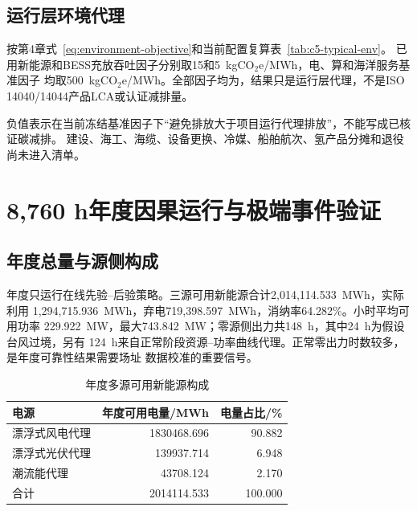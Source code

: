 \subsection{运行层环境代理}

按第4章式~\eqref{eq:environment-objective}和当前配置复算表~\ref{tab:c5-typical-env}。
已用新能源和BESS充放吞吐因子分别取15和5~kgCO$_2$e/MWh，电、算和海洋服务基准因子
均取500~kgCO$_2$e/MWh。全部因子均为\assumptiontag，结果只是运行层代理，不是ISO
14040/14044产品LCA或认证减排量\cite{iso14040,iso14044}。

\begin{table}[htbp]
\centering
\caption{正常典型48 h运行层温室气体代理}
\label{tab:c5-typical-env}
\end{table}

负值表示在当前冻结基准因子下“避免排放大于项目运行代理排放”，不能写成已核证碳减排。
建设、海工、海缆、设备更换、冷媒、船舶航次、氢产品分摊和退役尚未进入清单。

\section{8,760 h年度因果运行与极端事件验证}

\subsection{年度总量与源侧构成}

年度只运行在线先验--后验策略。三源可用新能源合计2,014,114.533~MWh，实际利用
1,294,715.936~MWh，弃电719,398.597~MWh，消纳率64.282\%。小时平均可用功率
229.922~MW，最大743.842~MW；零源侧出力共148~h，其中24~h为假设台风过境，另有
124~h来自正常阶段资源--功率曲线代理。正常零出力时数较多，是年度可靠性结果需要场址
数据校准的重要信号。

\begin{table}[htbp]
\centering
\caption{年度多源可用新能源构成}
\label{tab:c5-annual-source}
\begin{tabular}{lrr}
\toprule
电源 & 年度可用电量/MWh & 电量占比/\%\\
\midrule
漂浮式风电代理 & 1830468.696 & 90.882\\
漂浮式光伏代理 & 139937.714 & 6.948\\
潮流能代理 & 43708.124 & 2.170\\
合计 & 2014114.533 & 100.000\\
\bottomrule
\end{tabular}
\end{table}

